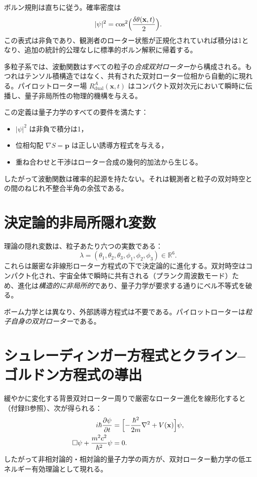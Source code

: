 \documentclass[a4paper]{article}
\begin{document}
ボルン規則は直ちに従う。確率密度は
\[
|\psi|^2 = \cos^2\Bigl(\frac{\delta\theta(\mathbf{x},t)}{2}\Bigr).
\]
この表式は非負であり、観測者のローター状態が正規化されていれば積分は1となり、追加の統計的公理なしに標準的ボルン解釈に帰着する。

多粒子系では、波動関数はすべての粒子の\emph{合成双対ローター}から構成される。もつれはテンソル積構造ではなく、共有された双対ローター位相から自動的に現れる。パイロットローター場 $R_{\text{dual}}^{A}(\mathbf{x},t)$ はコンパクト双対次元において瞬時に伝播し、量子非局所性の物理的機構を与える。

この定義は量子力学のすべての要件を満たす：
\begin{itemize}
\item $|\psi|^2$ は非負で積分は1，
\item 位相勾配 $\nabla S = \mathbf{p}$ は正しい誘導方程式を与える，
\item 重ね合わせと干渉はローター合成の幾何的加法から生じる。
\end{itemize}

したがって波動関数は確率的起源を持たない。それは観測者と粒子の双対時空との間のねじれ不整合半角の余弦である。

\section{決定論的非局所隠れ変数}

理論の隠れ変数は、粒子あたり六つの実数である：
\[
\lambda = (\theta_1,\theta_2,\theta_3, \phi_1,\phi_2,\phi_3) \in \mathbb{R}^6.
\]
これらは厳密な非線形ローター方程式の下で決定論的に進化する。双対時空はコンパクト化され、宇宙全体で瞬時に共有される（プランク周波数モード）ため、進化は\emph{構造的に非局所的}であり、量子力学が要求する通りにベル不等式を破る。

ボーム力学とは異なり、外部誘導方程式は不要である。パイロットローターは\emph{粒子自身の双対ローター}である。

\section{シュレーディンガー方程式とクライン--ゴルドン方程式の導出}

緩やかに変化する背景双対ローター周りで厳密なローター進化を線形化すると（付録B参照）、次が得られる：
\begin{align}
i\hbar \frac{\partial \psi}{\partial t}
  &= \Bigl[-\frac{\hbar^2}{2m}\nabla^2 + V(\mathbf{x})\Bigr]\psi, \\
\square \psi + \frac{m^2 c^2}{\hbar^2}\psi &= 0.
\end{align}
したがって非相対論的・相対論的量子力学の両方が、双対ローター動力学の低エネルギー有効理論として現れる。
\end{document}
